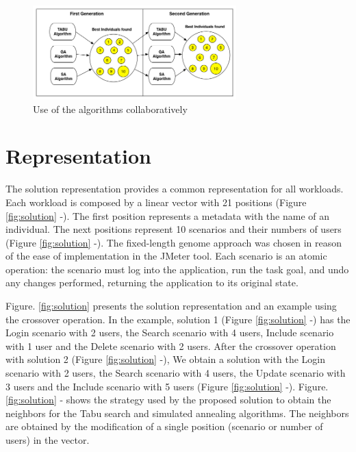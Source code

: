 \documentclass[espaco=umemeio,chapter=TITLE,twoside,openright]{abnt}
\begin{document}
\begin{figure}[h]
\centering
\includegraphics[width=0.7\textwidth]{./images/collaborative.png}
\caption{Use of the  algorithms collaboratively \cite{Gois2016}}
\label{fig:secondapproach}
\end{figure}



\section{Representation}

The solution representation provides a common representation for all workloads. Each workload is composed by a linear vector with 21 positions (Figure \ref{fig:solution}  -). The first position represents a metadata with the name of an individual. The next positions represent 10 scenarios and their numbers of users (Figure \ref{fig:solution}  -). The fixed-length genome approach was chosen in reason of the ease of implementation in the JMeter tool. Each scenario is an atomic operation: the scenario must log into the application, run the task goal, and undo any changes performed, returning the application to its original state.

Figure. \ref{fig:solution} presents the solution representation and an example using the crossover operation. In the example, solution 1 (Figure \ref{fig:solution}  -) has the Login scenario with 2 users, the Search scenario with 4 users, Include scenario with 1 user and the Delete scenario with 2 users.  After the crossover operation with solution 2 (Figure \ref{fig:solution}  -), We obtain a solution with the Login scenario with 2 users, the Search scenario with 4 users, the Update scenario with 3 users and the Include scenario with 5 users (Figure \ref{fig:solution}  -). Figure. \ref{fig:solution} - shows the strategy used by the proposed solution to  obtain the neighbors for the Tabu search and simulated annealing algorithms. The neighbors are obtained by the modification of a single position (scenario or number of users) in the vector.
\end{document}
